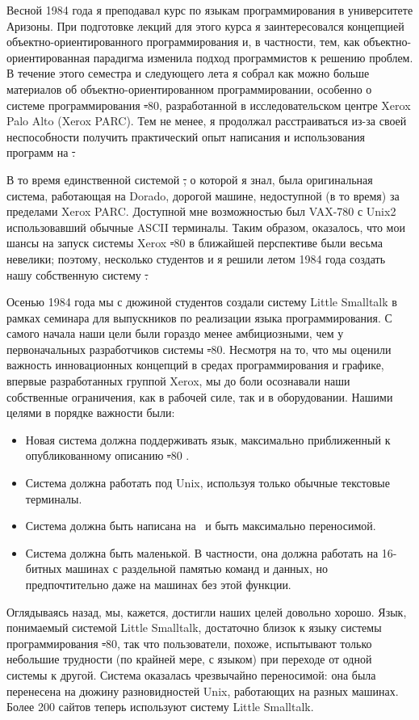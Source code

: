
Весной 1984 года я преподавал курс по языкам программирования в университете Аризоны. 
При подготовке лекций для этого курса я заинтересовался концепцией объектно-ориентированного 
программирования и, в частности, тем, как объектно-ориентированная парадигма изменила 
подход программистов к решению проблем. В течение этого семестра и следующего лета я 
собрал как можно больше материалов об объектно-ориентированном программировании, 
особенно о системе программирования \st-80, разработанной в исследовательском 
центре Xerox Palo Alto (Xerox PARC). Тем не менее, я продолжал расстраиваться из-за 
своей неспособности получить практический опыт написания и использования программ на \st.

В то время единственной системой \st, о которой я знал, была оригинальная система, 
работающая на Dorado, дорогой машине, недоступной (в то время) за пределами Xerox PARC. 
Доступной мне возможностью был VAX-780 с Unix2 использовавший обычные ASCII терминалы. 
Таким образом, оказалось, что мои шансы на запуск системы Xerox \st-80 в 
ближайшей перспективе были весьма невелики; поэтому, несколько студентов и я 
решили летом 1984 года создать нашу собственную систему \st.

Осенью 1984 года мы с дюжиной студентов создали систему Little Smalltalk в рамках 
семинара для выпускников по реализации языка программирования. С самого начала наши 
цели были гораздо менее амбициозными, чем у первоначальных разработчиков системы 
\st-80. Несмотря на то, что мы оценили важность инновационных концепций в 
средах программирования и графике, впервые разработанных группой Xerox, мы до боли 
осознавали наши собственные ограничения, как в рабочей силе, так и в оборудовании. 
Нашими целями в порядке важности были:
\begin{itemize}[nosep]
    \item Новая система должна поддерживать язык, максимально приближенный к 
    опубликованному описанию \st-80 \cite{blue}.
    \item Система должна работать под Unix, используя только обычные текстовые терминалы.
    \item Система должна быть написана на \ci\ и быть максимально переносимой.
    \item Система должна быть маленькой. В частности, она должна работать на 
    16-битных машинах с раздельной памятью команд и данных, 
    но предпочтительно даже на машинах без этой функции.
\end{itemize}

Оглядываясь назад, мы, кажется, достигли наших целей довольно хорошо. Язык, понимаемый 
системой Little Smalltalk, достаточно близок к языку системы программирования 
\st-80, так что пользователи, похоже, испытывают только небольшие трудности 
(по крайней мере, с языком) при переходе от одной системы к другой. Система 
оказалась чрезвычайно переносимой: она была перенесена на дюжину разновидностей 
Unix, работающих на разных машинах. Более 200 сайтов теперь используют 
систему Little Smalltalk.

